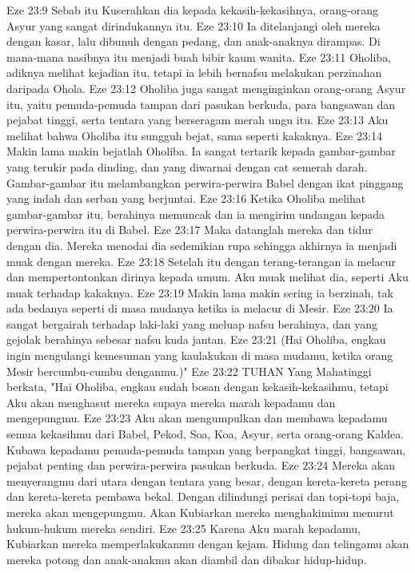Eze 23:9  Sebab itu Kuserahkan dia kepada kekasih-kekasihnya, orang-orang Asyur yang sangat dirindukannya itu.
Eze 23:10  Ia ditelanjangi oleh mereka dengan kasar, lalu dibunuh dengan pedang, dan anak-anaknya dirampas. Di mana-mana nasibnya itu menjadi buah bibir kaum wanita.
Eze 23:11  Oholiba, adiknya melihat kejadian itu, tetapi ia lebih bernafsu melakukan perzinahan daripada Ohola.
Eze 23:12  Oholiba juga sangat menginginkan orang-orang Asyur itu, yaitu pemuda-pemuda tampan dari pasukan berkuda, para bangsawan dan pejabat tinggi, serta tentara yang berseragam merah ungu itu.
Eze 23:13  Aku melihat bahwa Oholiba itu sungguh bejat, sama seperti kakaknya.
Eze 23:14  Makin lama makin bejatlah Oholiba. Ia sangat tertarik kepada gambar-gambar yang terukir pada dinding, dan yang diwarnai dengan cat semerah darah. Gambar-gambar itu melambangkan perwira-perwira Babel dengan ikat pinggang yang indah dan serban yang berjuntai.
Eze 23:16  Ketika Oholiba melihat gambar-gambar itu, berahinya memuncak dan ia mengirim undangan kepada perwira-perwira itu di Babel.
Eze 23:17  Maka datanglah mereka dan tidur dengan dia. Mereka menodai dia sedemikian rupa sehingga akhirnya ia menjadi muak dengan mereka.
Eze 23:18  Setelah itu dengan terang-terangan ia melacur dan mempertontonkan dirinya kepada umum. Aku muak melihat dia, seperti Aku muak terhadap kakaknya.
Eze 23:19  Makin lama makin sering ia berzinah, tak ada bedanya seperti di masa mudanya ketika ia melacur di Mesir.
Eze 23:20  Ia sangat bergairah terhadap laki-laki yang meluap nafsu berahinya, dan yang gejolak berahinya sebesar nafsu kuda jantan.
Eze 23:21  (Hai Oholiba, engkau ingin mengulangi kemesuman yang kaulakukan di masa mudamu, ketika orang Mesir bercumbu-cumbu denganmu.)"
Eze 23:22  TUHAN Yang Mahatinggi berkata, "Hai Oholiba, engkau sudah bosan dengan kekasih-kekasihmu, tetapi Aku akan menghasut mereka supaya mereka marah kepadamu dan mengepungmu.
Eze 23:23  Aku akan mengumpulkan dan membawa kepadamu semua kekasihmu dari Babel, Pekod, Soa, Koa, Asyur, serta orang-orang Kaldea. Kubawa kepadamu pemuda-pemuda tampan yang berpangkat tinggi, bangsawan, pejabat penting dan perwira-perwira pasukan berkuda.
Eze 23:24  Mereka akan menyerangmu dari utara dengan tentara yang besar, dengan kereta-kereta perang dan kereta-kereta pembawa bekal. Dengan dilindungi perisai dan topi-topi baja, mereka akan mengepungmu. Akan Kubiarkan mereka menghakimimu menurut hukum-hukum mereka sendiri.
Eze 23:25  Karena Aku marah kepadamu, Kubiarkan mereka memperlakukanmu dengan kejam. Hidung dan telingamu akan mereka potong dan anak-anakmu akan diambil dan dibakar hidup-hidup.
